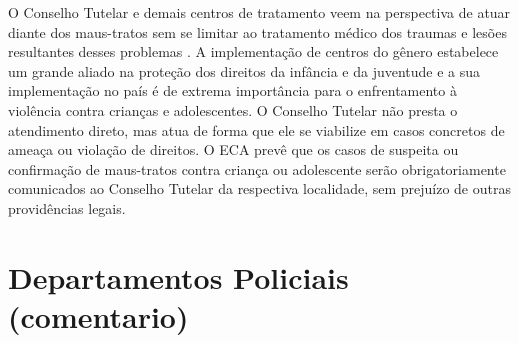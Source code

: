 O Conselho Tutelar e demais centros de tratamento veem na perspectiva de atuar diante dos maus-tratos sem se limitar ao tratamento médico dos traumas e lesões resultantes desses problemas \cite{brasil2002notificaccao}. A implementação de centros do gênero estabelece um grande aliado na proteção dos direitos da infância e da juventude e a sua implementação no país é de extrema importância para o enfrentamento à violência contra crianças e adolescentes. %
O Conselho Tutelar não presta o atendimento direto, mas atua de forma que ele se viabilize em casos concretos de ameaça ou violação de direitos. O ECA prevê que os casos de suspeita ou confirmação de maus-tratos contra criança ou adolescente serão obrigatoriamente comunicados ao Conselho Tutelar da respectiva localidade, sem prejuízo de outras providências legais.





\section{Departamentos Policiais (comentario)}\label{sec:dp}



